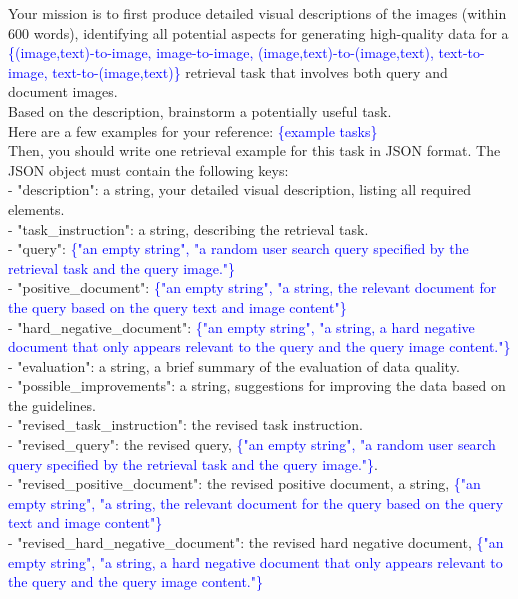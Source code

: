 \begin{figure*}[t]
\centering
\begin{prompt}[title={Prompt: Synthesizing Retrieval Data (With Document Images)}, label=prompt:ret_three_image]
Your mission is to first produce detailed visual descriptions of the images (within 600 words), identifying all potential aspects for generating high-quality data for a \textcolor{blue}{\{(image,text)-to-image, image-to-image, (image,text)-to-(image,text), text-to-image, text-to-(image,text)\}} retrieval task that involves both query and document images.\\
    
Based on the description, brainstorm a potentially useful task. \\

Here are a few examples for your reference:
\textcolor{blue}{\{example tasks\}} \\

Then, you should write one retrieval example for this task in JSON format. The JSON object must contain the following keys: \\

- "description": a string, your detailed visual description, listing all required elements. \\
- "task\_instruction": a string, describing the retrieval task. \\
- "query": \textcolor{blue}{\{"an empty string", "a random user search query specified by the retrieval task and the query image."\}} \\
- "positive\_document": \textcolor{blue}{\{"an empty string", "a string, the relevant document for the query based on the query text and image content"\}} \\
- "hard\_negative\_document": \textcolor{blue}{\{"an empty string", "a string, a hard negative document that only appears relevant to the query and the query image content."\}} \\
- "evaluation": a string, a brief summary of the evaluation of data quality. \\
- "possible\_improvements": a string, suggestions for improving the data based on the guidelines. \\
- "revised\_task\_instruction": the revised task instruction. \\
- "revised\_query": the revised query, \textcolor{blue}{\{"an empty string", "a random user search query specified by the retrieval task and the query image."\}}. \\
- "revised\_positive\_document": the revised positive document, a string, \textcolor{blue}{\{"an empty string", "a string, the relevant document for the query based on the query text and image content"\}} \\
- "revised\_hard\_negative\_document": the revised hard negative document, \textcolor{blue}{\{"an empty string", "a string, a hard negative document that only appears relevant to the query and the query image content."\}} \\


\end{prompt}
\end{figure*}
